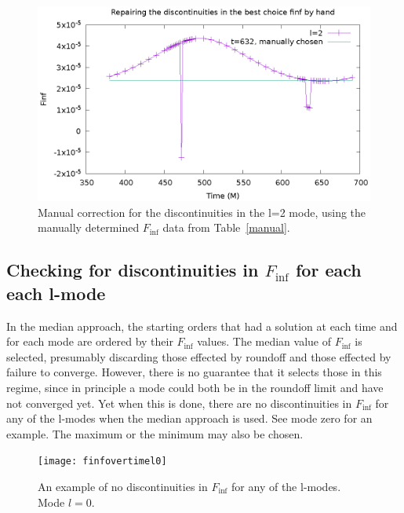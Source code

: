 \begin{figure}
  \includegraphics{bestFinfManuallyChosent632l2}
\caption{Manual correction for the discontinuities in the l=2 mode, using the manually determined $F_{\inf}$ data from Table~\ref{manual}. }
\label{manualfix}          
\end{figure}

\subsection{ Checking for discontinuities in $F_{\inf}$ for each each l-mode}

In the median approach, the starting orders that had a solution at each time and for each mode are ordered by their $F_{\inf}$ values. The median value of $F_{\inf}$ is selected, presumably discarding those effected by roundoff and those effected by failure to converge. However, there is no guarantee that it selects those in this regime, since in principle a mode could both be in the roundoff limit and have not converged yet. Yet when this is done, there are no discontinuities in $F_{\inf}$ for any of the l-modes when the median approach is used. See mode zero for an example. The maximum or the minimum may also be chosen.

\begin{figure}
  \texttt{[image: finfovertimel0]}
  \caption{An example of no discontinuities in $F_{\inf}$ for any of the l-modes. Mode $l=0$.}
\end{figure}


